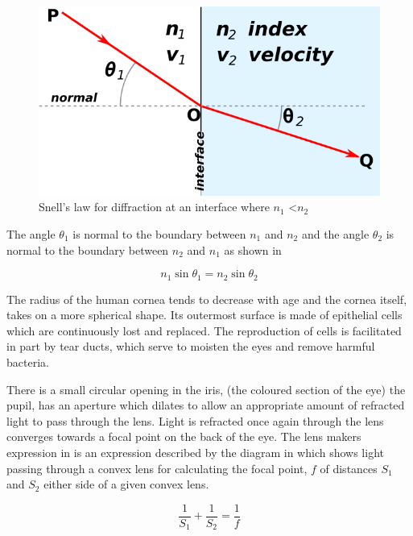 \begin{figure}[htbp]
  \centering
    \includegraphics{figures/snells}
  \caption{Snell's law for diffraction at an interface where $n_1$ \textless $n_2$}
  \label{fig:snell}
\end{figure}

The angle $\theta_1$ is normal to the boundary between $n_1$ and $n_2$
and the angle $\theta_2$ is normal to the boundary between $n_2$ and $n_1$
as shown in 

\begin{equation}
n_1\sin\theta_1=n_2\sin\theta_2
\label{eq:refractive}
\end{equation}

The radius of the human cornea tends to decrease with age and the cornea
itself, takes on a more spherical shape.\cite{guirao2000optical} Its
outermost surface is made of epithelial cells which are continuously lost
and replaced.\cite{jester1999cellular,hassell2010molecular} The reproduction
of cells is facilitated in part by tear ducts, which  serve to moisten the
eyes and remove harmful bacteria.\cite{holly1977tear}

There is a small circular opening in the iris, (the coloured section of
the eye) the pupil, has an aperture which dilates to allow an appropriate
amount of refracted light to pass through the lens. Light is refracted
once again through the lens converges towards a focal point on the back
of the eye. The lens makers expression in  is an
expression described by the diagram in  which
shows light passing through a convex lens for calculating the focal point,
$f$ of distances $S_1$ and $S_2$ either side of a given convex lens.
\cite{greivenkamp2004field}

\begin{equation}
\frac{1}{S_1} + \frac{1}{S_2} = \frac{1}{f}
\label{eq:lens_makers}
\end{equation}

